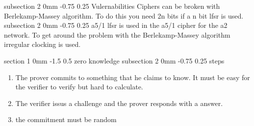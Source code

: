\documentclass[a4paper,11pt]{article}
\makeatletter
\renewcommand{\section}{\@startsection
   {section}%
   {1}%
   {0mm}%
   {-1.5\baselineskip}%
   {0.5\baselineskip}%
   {\sffamily\bfseries\upshape\normalsize}}%
\renewcommand{\subsection}{\@startsection
   {subsection}%
   {2}%
   {0mm}%
   {-0.75\baselineskip}%
   {0.25\baselineskip}%
   {\rmfamily\normalfont\slshape\normalsize}}%
\makeatother
\begin{document}
\subsection{Vulernabilities}
Ciphers can be broken with  Berlekamp-Massey algorithm. To do this you need 2n bits if a n bit lfsr is used.
\subsection{a5/1}
lfsr is used in the a5/1 cipher for the a2 network. To get around the problem with the Berlekamp-Massey algorithm irregular clocking is used.

\section{zero knowledge}
\subsection{steps}
\begin{enumerate}
\item The prover commits to something that he claims to know. It must be easy for the verifier to verify but hard to calculate.
\item The verifier issus a challenge and the prover responds with a answer.
\item the commitment must be random
\end{enumerate}
\end{document}
